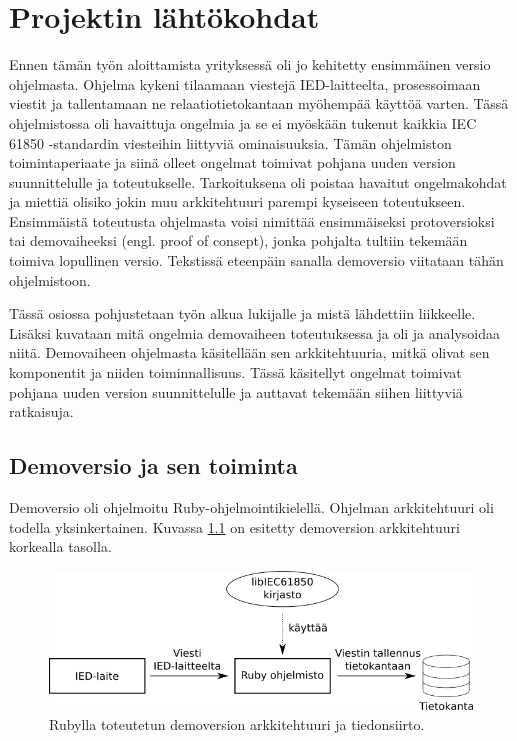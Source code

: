 \chapter{Projektin lähtökohdat}
\label{ch:projektin-lähtökohdat}
Ennen tämän työn aloittamista yrityksessä oli jo kehitetty ensimmäinen versio ohjelmasta. Ohjelma kykeni tilaamaan viestejä IED-laitteelta, prosessoimaan viestit ja tallentamaan ne relaatiotietokantaan myöhempää käyttöä varten. Tässä ohjelmistossa oli havaittuja ongelmia ja se ei myöskään tukenut kaikkia IEC 61850 -standardin viesteihin liittyviä ominaisuuksia. Tämän ohjelmiston toimintaperiaate ja siinä olleet ongelmat toimivat pohjana uuden version suunnittelulle ja toteutukselle. Tarkoituksena oli poistaa havaitut ongelmakohdat ja miettiä olisiko jokin muu arkkitehtuuri parempi kyseiseen toteutukseen. Ensimmäistä toteutusta ohjelmasta voisi nimittää ensimmäiseksi protoversioksi tai demovaiheeksi (engl. proof of consept), jonka pohjalta tultiin tekemään toimiva lopullinen versio. Tekstissä eteenpäin sanalla demoversio viitataan tähän ohjelmistoon.

Tässä osiossa pohjustetaan työn alkua lukijalle ja mistä lähdettiin liikkeelle. Lisäksi kuvataan mitä ongelmia demovaiheen toteutuksessa ja oli ja analysoidaa niitä. Demovaiheen ohjelmasta käsitellään sen arkkitehtuuria, mitkä olivat sen komponentit ja niiden toiminnallisuus. Tässä käsitellyt ongelmat toimivat pohjana uuden version suunnittelulle ja auttavat tekemään siihen liittyviä ratkaisuja.


\section{Demoversio ja sen toiminta}
\label{ch:demoversio-ja-sen-toiminta}
Demoversio oli ohjelmoitu Ruby-ohjelmointikielellä. Ohjelman arkkitehtuuri oli todella yksinkertainen. Kuvassa \ref{fig:demo-architecture} on esitetty demoversion arkkitehtuuri korkealla tasolla.

\begin{figure}[ht!]
	\includegraphics[width=1\textwidth]{pictures/demo-architecture.png}
	\caption{Rubylla toteutetun demoversion arkkitehtuuri ja tiedonsiirto.}
	\label{fig:demo-architecture}
\end{figure}

